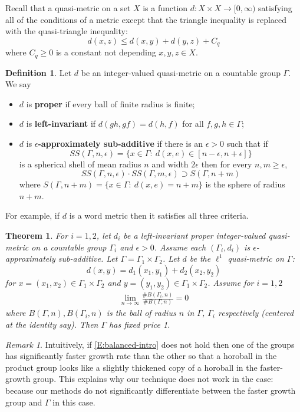 \documentclass[12pt]{article}
\theoremstyle{plain}
\newtheorem{thm}{Theorem}[section]
\theoremstyle{definition}
\newtheorem{defn}{Definition}
\theoremstyle{remark}
\newtheorem{remark}{Remark}
\newcommand{\G}{\Gamma}
\newcommand{\eps}{\epsilon}
\begin{document}
Recall that a quasi-metric on a set $X$ is a function $d:X\times X \to [0,\infty)$ satisfying all of the conditions of a metric except that the triangle inequality is replaced with the quasi-triangle inequality:
$$d(x,z)\le d(x,y)+d(y,z)+C_q$$
where $C_q\ge 0$ is a constant not depending $x,y,z\in X$.

\begin{defn}%
Let $d$ be an integer-valued quasi-metric on a countable group $\G$. We say 
\begin{itemize}
    \item $d$  is {\bf proper} if every ball of finite radius is finite;
    \item $d$ is {\bf left-invariant} if $d(gh,gf)=d(h,f)$ for all $f,g,h\in \G$;
    \item $d$ is {\bf $\eps$-approximately sub-additive} if there is an $\eps>0$ such that    if 
    $$SS(\G,n,\eps)=\{x\in \G:~d(x,e) \in [n-\eps,n+\eps]\}$$
is a spherical shell of mean radius $n$ and width $2\eps$ then for every $n,m\ge \eps$,
$$SS(\G,n,\eps)\cdot SS(\G,m,\eps) \supset S(\G,n+m)$$
where $S(\G,n+m)=\{x\in \G:~d(x,e)=n+m\}$ is the sphere of radius $n+m$. 
\end{itemize}
For example, if $d$ is a word metric then it satisfies all three criteria.
\end{defn}

\begin{thm}\label{T:main3-intro}
For $i=1,2$, let $d_i$ be a left-invariant proper integer-valued quasi-metric on a countable group $\G_i$ and $\eps>0$. Assume each $(\G_i,d_i)$ is $\eps$-approximately sub-additive. Let $\G=\G_1\times \G_2$. Let $d$ be the $\ell^1$ quasi-metric on $\G$:
$$d(x,y) = d_1(x_1,y_1)+d_2(x_2,y_2)$$
for $x=(x_1,x_2)\in \G_1\times \G_2$ and $y=(y_1,y_2)\in \G_1\times \G_2$. Assume for $i=1,2$
\begin{align}\label{E:balanced-intro}
    \lim_{n\to\infty}  \frac{\#B(\G_i,n)}{\#B(\G,n)} = 0
\end{align}
where $B(\G,n),B(\G_i,n) $ is the ball of radius $n$ in $\G$, $\G_i$ respectively (centered at the identity say). Then $\G$ has fixed price 1.
\end{thm}

\begin{remark}
    Intuitively, if \eqref{E:balanced-intro} does not hold then one of the groups has significantly faster growth rate than the other so that a horoball in the product group looks like a slightly thickened copy of a horoball in the faster-growth group. This explains why our technique does not work in the case: because our methods do not significantly differentiate between the faster growth group and $\G$ in this case.  
\end{remark}
\end{document}
